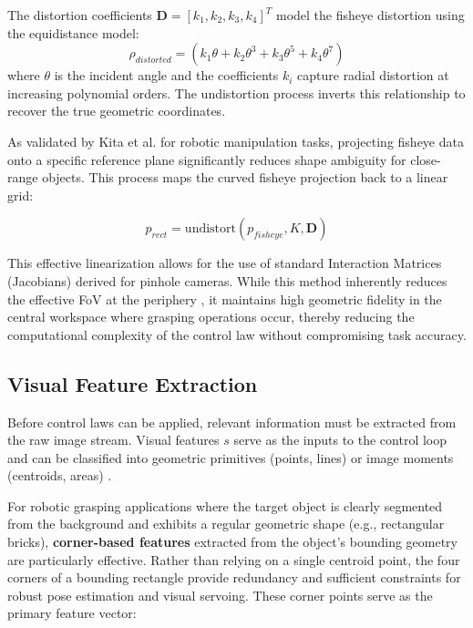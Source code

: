 The distortion coefficients $\mathbf{D} = [k_1, k_2, k_3, k_4]^T$ model the fisheye distortion using the equidistance model:
\begin{equation}
    \rho_{distorted} = \left(k_1 \theta + k_2 \theta^3 + k_3 \theta^5 + k_4 \theta^7\right)
\end{equation}
where $\theta$ is the incident angle and the coefficients $k_i$ capture radial distortion at increasing polynomial orders. The undistortion process inverts this relationship to recover the true geometric coordinates.

As validated by Kita et al. \cite{Kita2011} for robotic manipulation tasks, projecting fisheye data onto a specific reference plane significantly reduces shape ambiguity for close-range objects. This process maps the curved fisheye projection back to a linear grid:

\begin{equation}
    p_{rect} = \text{undistort}(p_{fisheye}, K, \mathbf{D})
\end{equation}

This effective linearization allows for the use of standard Interaction Matrices (Jacobians) derived for pinhole cameras. While this method inherently reduces the effective FoV at the periphery \cite{Khomutenko2016}, it maintains high geometric fidelity in the central workspace where grasping operations occur, thereby reducing the computational complexity of the control law without compromising task accuracy.

\subsection{Visual Feature Extraction}
Before control laws can be applied, relevant information must be extracted from the raw image stream. Visual features $s$ serve as the inputs to the control loop and can be classified into geometric primitives (points, lines) or image moments (centroids, areas) \cite{Chaumette2006}.

For robotic grasping applications where the target object is clearly segmented from the background and exhibits a regular geometric shape (e.g., rectangular bricks), \textbf{corner-based features} extracted from the object's bounding geometry are particularly effective. Rather than relying on a single centroid point, the four corners of a bounding rectangle provide redundancy and sufficient constraints for robust pose estimation and visual servoing. These corner points serve as the primary feature vector:

